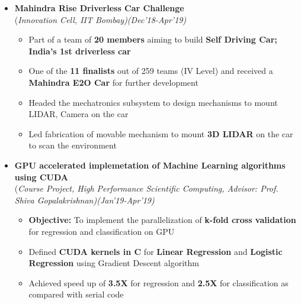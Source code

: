 \documentclass[a4paper,10pt]{article}
\begin{document}
\begin{itemize}
\item \textbf{Mahindra Rise Driverless Car Challenge}\\
(\emph{Innovation Cell, IIT Bombay)\hfill (Dec’18-Apr'19)} \\[-0.4cm]
	\begin{itemize}[noitemsep,nolistsep]
    \item Part of a team of \textbf{20 members} aiming to build \textbf{Self Driving Car; India’s 1st driverless car}
    \item One of the \textbf{11 finalists} out of 259 teams (IV Level) and received a \textbf{Mahindra E2O Car} for further development
     \item Headed the mechatronics subsystem to design mechanisms to mount LIDAR, Camera on the car 
    \item Led fabrication of movable mechanism to mount \textbf{3D LIDAR} on the car to scan the environment 
	\end{itemize}
	
\item \textbf{GPU accelerated implemetation of Machine Learning algorithms using CUDA}\\
(\emph{Course Project, High Performance Scientific Computing, Advisor: Prof. Shiva Gopalakrishnan)\hfill (Jan'19-Apr’19)} \\[-0.4cm]
	\begin{itemize}[noitemsep,nolistsep]
	\item \textbf{Objective:} To implement the parallelization of \textbf{k-fold cross validation} for regression and classification on GPU
    \item Defined \textbf{CUDA kernels in C} for \textbf{Linear Regression} and \textbf{Logistic Regression} using Gradient Descent algorithm
    \item Achieved speed up of  \textbf{3.5X} for regression and \textbf{2.5X} for classification as compared with serial code
	\end{itemize}
	

\end{itemize}
\end{document}
